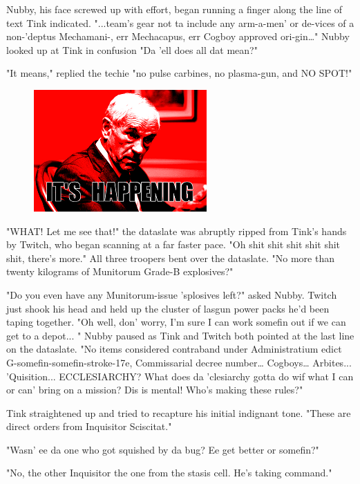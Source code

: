 Nubby, his face screwed up with effort, began running a finger along the line of text Tink indicated. 
"...team's gear not ta include any arm-a-men' or de-vices of a non-'deptus Mechamani-, err Mechacapus, err Cogboy approved ori-gin…" Nubby looked up at Tink in confusion "Da 'ell does all dat mean?" 

"It means," replied the techie "no pulse carbines, no plasma-gun, and NO SPOT!" 

\begin{figure}
	\begin{center}
		\includegraphics[width=\figwidth]{pics/17/2.png}
	\end{center}
\end{figure}
"WHAT! 
Let me see that!" the dataslate was abruptly ripped from Tink's hands by Twitch, who began scanning at a far faster pace. 
"Oh shit shit shit shit shit shit, there's more." All three troopers bent over the dataslate. 
"No more than twenty kilograms of Munitorum Grade-B explosives?"

"Do you even have any Munitorum-issue 'splosives left?" asked Nubby. 
Twitch just shook his head and held up the cluster of lasgun power packs he'd been taping together. 
"Oh well, don' worry, I'm sure I can work somefin out if we can get to a depot... 
" Nubby paused as Tink and Twitch both pointed at the last line on the dataslate. 
"No items considered contraband under Administratium edict G-somefin-somefin-stroke-17e, Commissarial decree number… Cogboys… Arbites... 
'Quisition... 
ECCLESIARCHY? 
What does da 'clesiarchy gotta do wif what I can or can' bring on a mission? 
Dis is mental! 
Who's making these rules?"

Tink straightened up and tried to recapture his initial indignant tone. 
"These are direct orders from Inquisitor Sciscitat."

"Wasn' ee da one who got squished by da bug? 
Ee get better or somefin?"

"No, the other Inquisitor the one from the stasis cell. 
He's taking command."

